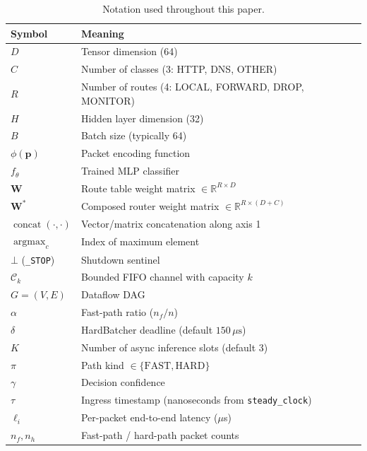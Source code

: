 \documentclass[11pt,a4paper,twoside]{article}
\theoremstyle{definition}
\theoremstyle{remark}
\newcommand{\R}{\mathbb{R}}
\newcommand{\argmax}{\operatorname{argmax}}
\newcommand{\concat}{\operatorname{concat}}
\newcommand{\mat}[1]{\mathbf{#1}}
\newcommand{\vect}[1]{\mathbf{#1}}
\begin{document}
\begin{table}[H]
\centering
\small
\begin{tabular}{ll}
\toprule
\textbf{Symbol} & \textbf{Meaning} \\
\midrule
$D$ & Tensor dimension (64) \\
$C$ & Number of classes (3: HTTP, DNS, OTHER) \\
$R$ & Number of routes (4: LOCAL, FORWARD, DROP, MONITOR) \\
$H$ & Hidden layer dimension (32) \\
$B$ & Batch size (typically 64) \\
$\phi(\vect{p})$ & Packet encoding function \\
$f_\theta$ & Trained MLP classifier \\
$\mat{W}$ & Route table weight matrix $\in \R^{R \times D}$ \\
$\mat{W}^*$ & Composed router weight matrix $\in \R^{R \times (D+C)}$ \\
$\concat(\cdot, \cdot)$ & Vector/matrix concatenation along axis 1 \\
$\argmax_c$ & Index of maximum element \\
$\bot$ (\texttt{\_STOP}) & Shutdown sentinel \\
$\mathcal{C}_k$ & Bounded FIFO channel with capacity $k$ \\
$G = (V, E)$ & Dataflow DAG \\
$\alpha$ & Fast-path ratio ($n_f / n$) \\
$\delta$ & HardBatcher deadline (default $150\,\mu\text{s}$) \\
$K$ & Number of async inference slots (default 3) \\
$\pi$ & Path kind $\in \{\text{FAST}, \text{HARD}\}$ \\
$\gamma$ & Decision confidence \\
$\tau$ & Ingress timestamp (nanoseconds from \texttt{steady\_clock}) \\
$\ell_i$ & Per-packet end-to-end latency ($\mu$s) \\
$n_f, n_h$ & Fast-path / hard-path packet counts \\
\bottomrule
\end{tabular}
\caption{Notation used throughout this paper.}
\end{table}
\end{document}
